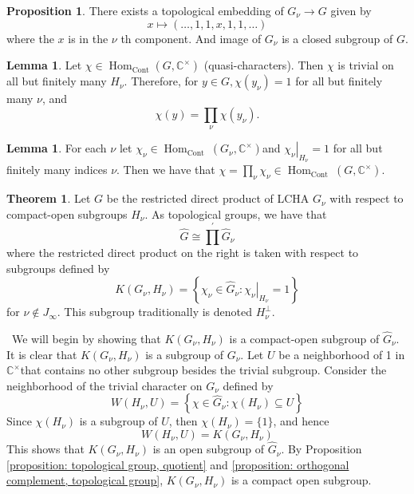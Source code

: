 \documentclass[12pt,a4paper]{book}
\newenvironment{prooff}{{\noindent\it\textcolor{cyan!40!black}{Proof}:}\,}{\par}
\theoremstyle{definition}
\newtheorem{theo}[defn]{Theorem}
\newtheorem{lem}[defn]{Lemma}
\newtheorem{prop}[defn]{Proposition}
\begin{document}
\begin{prop}
    There exists a topological embedding of $G_\nu \longrightarrow G$ given by
    $$
    x \longmapsto(\ldots, 1,1, x, 1,1, \ldots)
    $$
    where the $x$ is in the $\nu$ th component. And image of $G_\nu$ is a closed subgroup 
    of $G$.
\end{prop}
\begin{lem}
    Let $\chi \in \operatorname{Hom}_{\text{Cont}}\left(G, \mathbb{C}^{\times}\right)$
    (quasi-characters).
    Then $\chi$ is trivial on all but finitely many $H_\nu$. Therefore, for $y \in G, \chi\left(y_\nu\right)=1$ for all but finitely many $\nu$, and
    $$
    \chi(y)=\prod_\nu \chi\left(y_\nu\right) .
    $$
    \label{lemma: quasi-characters, restricted direct product}
\end{lem}
\begin{lem}
    For each $\nu$ let $\chi_\nu \in \operatorname{Hom}_{\text {Cont }}\left(G_\nu, \mathbb{C}^{\times}\right)$and $\left.\chi_\nu\right|_{H_\nu}=1$ for all but finitely many indices $\nu$. Then we have that $\chi=\prod_\nu \chi_\nu \in \operatorname{Hom}_{\text {Cont }}\left(G, \mathbb{C}^{\times}\right)$.
\end{lem}
\begin{theo}
    Let $G$ be the restricted direct product of LCHA $G_\nu$ with respect to compact-open subgroups $H_\nu$. As topological groups, we have that
    $$
    \hat{G} \cong \prod^{\prime} \hat{G}_\nu
    $$
    where the restricted direct product on the right is taken with respect to subgroups defined by
    $$
    K\left(G_\nu, H_\nu\right)=\left\{\chi_\nu \in \hat{G}_\nu:\left.\chi_\nu\right|_{H_\nu}=1\right\}
    $$
    for $\nu \notin J_{\infty}$. This subgroup traditionally is denoted $H_\nu^{\perp}$.
\end{theo}
\begin{prooff}
    We will begin by showing that $K\left(G_\nu, H_\nu\right)$ is a compact-open subgroup of $\hat{G}_\nu$. It is clear that $K\left(G_\nu, H_\nu\right)$ is a subgroup of $G_\nu$. Let $U$ be a neighborhood of 1 in $\mathbb{C}^{\times}$that contains no other subgroup besides the trivial subgroup. Consider the neighborhood of the trivial character on $G_\nu$ defined by
    $$
    W\left(H_\nu, U\right)=\left\{\chi \in \hat{G}_\nu: \chi\left(H_\nu\right) \subseteq U\right\}
    $$
    Since $\chi\left(H_\nu\right)$ is a subgroup of $U$, then $\chi\left(H_\nu\right)=\{1\}$, and hence
    $$
    W\left(H_\nu, U\right)=K\left(G_\nu, H_\nu\right)
    $$
    This shows that $K\left(G_\nu, H_\nu\right)$ is an open subgroup of $\hat{G}_\nu$. By Proposition\,\ref{proposition: topological group, quotient} and \ref{proposition: orthogonal complement, topological group},
    $K\left(G_\nu, H_\nu\right)$ is a compact open subgroup.
\end{prooff}
\end{document}
